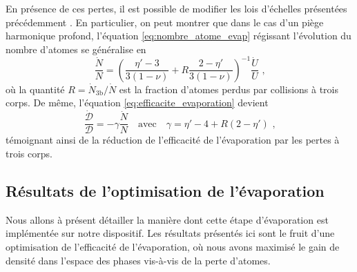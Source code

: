 En présence de ces pertes, il est possible de modifier les lois d'échelles présentées précédemment \citep{luiten1996kinetic}\citep{brantut2009manipulation}. En particulier, on peut montrer que dans le cas d'un piège harmonique profond, l'équation \ref{eq:nombre_atome_evap} régissant l'évolution du nombre d'atomes se généralise en
\begin{equation}
\frac{\dot{N}}{N}= \left( \frac{\eta'-3}{3(1-\nu)} + R \frac{2-\eta'}{3(1-\nu)} \right)^{-1} \frac{\dot{U}}{U} \text{ ,}
\label{eq:scaling_atomes_3corps}
\end{equation}
où la quantité $R=\dot{N}_{\mathrm{3b}}/\dot{N}$ est la fraction d'atomes perdus par collisions à trois corps. De même, l'équation \ref{eq:efficacite_evaporation} devient
\begin{equation}
\frac{\dot{\mathcal{D}}}{\mathcal{D}}=-\gamma \frac{\dot{N}}{N} \quad \text{avec} \quad \gamma=\eta'-4 + R(2-\eta') \text{ ,}
\label{eq:efficacite_evap_3corps}
\end{equation}
témoignant ainsi de la réduction de l'efficacité de l'évaporation par les pertes à trois corps.





\subsection{Résultats de l'optimisation de l'évaporation}
Nous allons à présent détailler la manière dont cette étape d'évaporation est implémentée sur notre dispositif. Les résultats présentés ici sont le fruit d'une optimisation de l'efficacité de l'évaporation, où nous avons maximisé le gain de densité dans l'espace des phases vis-à-vis de la perte d'atomes. %



